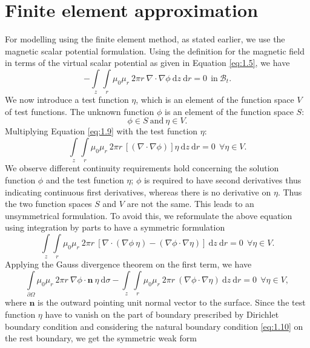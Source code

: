 \section{Finite element approximation}
For modelling using the finite element method, as stated earlier, we use the magnetic scalar potential formulation. Using the definition for the magnetic field in terms of the virtual scalar potential as given in Equation \eqref{eq:1.5}, we have
\begin{equation}
-\int\limits_{z} \int\limits_{r} \mu_0 \mu_r \ 2 \pi r \ \nabla \cdot \nabla \phi \ \mathrm{d}z \ \mathrm{d}r = 0 \ \ \text{in} \ \mathcal{B}_t.
\label{eq:1.9}
\end{equation}
We now introduce a test function $\eta$, which is an element of the function space $V$ of test functions. The unknown function $\phi$ is an element of the function space $S$:
\begin{equation}
\phi \in S \ \text{and} \ \eta \in V.
\end{equation}
Multiplying Equation \eqref{eq:1.9} with the test function $\eta$:
\begin{equation}
\int\limits_{z} \int\limits_{r} \mu_0 \mu_r \ 2 \pi r \ [(\nabla \cdot \nabla \phi)] \eta \ \mathrm{d}z \ \mathrm{d}r = 0 \ \ \forall \eta \in V.
\end{equation}
We observe different continuity requirements hold concerning the solution function $\phi$ and the test function $\eta$; $\phi$ is required to have second derivatives thus indicating continuous first derivatives, whereas there is no derivative on $\eta$. Thus the two function spaces $S$ and $V$ are not the same. This leads to an unsymmetrical formulation. To avoid this, we reformulate the above equation using integration by parts to have a symmetric formulation
\begin{equation}
\int\limits_{z} \int\limits_{r} \mu_0 \mu_r \ 2 \pi r \ [ \nabla \cdot (\nabla\phi \ \eta) - (\nabla \phi \cdot \nabla \eta) ] \ \mathrm{d}z \ \mathrm{d}r = 0 \ \ \forall \eta \in V.
\end{equation}
Applying the Gauss divergence theorem on the first term, we have
\begin{equation}
\int\limits_{\partial \Omega} \mu_0 \mu_r \ 2 \pi r \ \nabla \phi \cdot \mathbf{n} \ \eta \ \mathrm{d}\sigma - \int\limits_{z} \int\limits_{r} \mu_0 \mu_r \ 2 \pi r \ (\nabla \phi \cdot \nabla \eta) \ \mathrm{d}z \ \mathrm{d}r = 0 \ \ \forall \eta \in V,
\end{equation}
where $\mathbf{n}$ is the outward pointing unit normal vector to the surface. Since the test function $\eta$ have to vanish on the part of boundary prescribed by Dirichlet boundary condition and considering the natural boundary condition \eqref{eq:1.10} on the rest boundary, we get the symmetric weak form
